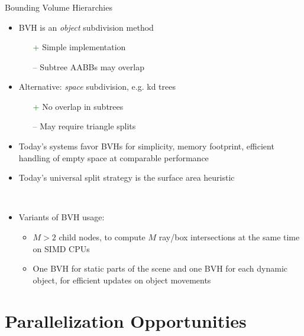 \documentclass[utf8,stillsansserifmath,fleqn,t]{beamer}
\begin{document}
\begin{frame}
\frametitle{\insertsection}
Bounding Volume Hierarchies
\begin{itemize}
\item BVH is an \emph{object} subdivision method
    \begin{itemize}
    \item[\textcolor{DarkGreen}{+}] Simple implementation
    \item[\textcolor{DarkRed}{--}] Subtree AABBs may overlap
    \end{itemize}
\item Alternative: \emph{space} subdivision, e.g. kd trees
    \begin{itemize}
    \item[\textcolor{DarkGreen}{+}] No overlap in subtrees
    \item[\textcolor{DarkRed}{--}] May require triangle splits 
    \end{itemize}
\item Today's systems favor BVHs for simplicity, memory footprint,
efficient handling of empty space at comparable performance
\item Today's universal split strategy is the surface area heuristic
\item[~]
\item Variants of BVH usage:
    \begin{itemize}
    \item $M>2$ child nodes, to compute $M$ ray/box intersections at the same
    time on SIMD CPUs
    \item One BVH for static parts of the scene and one BVH for each dynamic
    object, for efficient updates on object movements
    \end{itemize}
\end{itemize}
\end{frame}

\section{Parallelization Opportunities}
\end{document}
